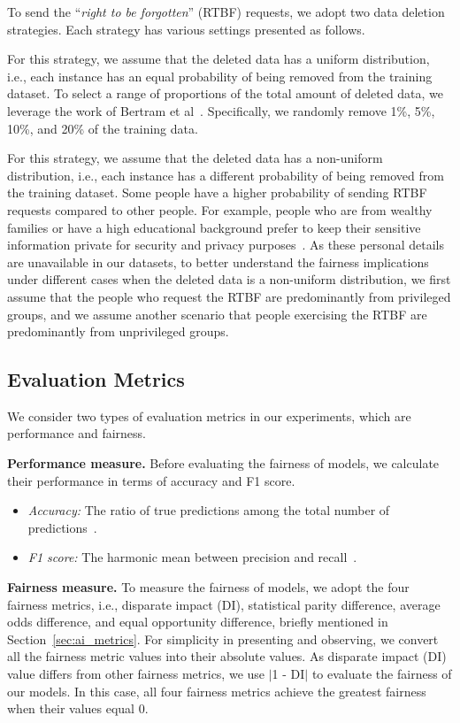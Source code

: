 To send the ``\textit{right to be forgotten}'' (RTBF) requests, we adopt two data deletion strategies. Each strategy has various settings presented as follows.


 For this strategy, we assume that the deleted data has a uniform distribution, i.e., each instance has an equal probability of being removed from the training dataset. To select a range of proportions of the total amount of deleted data, we leverage the work of Bertram et al~\cite{rtbf5years}. Specifically, we randomly remove 1\%, 5\%, 10\%, and 20\% of the training data. 

 For this strategy, we assume that the deleted data has a non-uniform distribution, i.e., each instance has a different probability of being removed from the training dataset. Some people have a higher probability of sending RTBF requests compared to other people. For example, people who are from wealthy families or have a high educational background prefer to keep their sensitive information private for security and privacy purposes~\cite{upton2001strategic, eurobarometer}. 
As these personal details are unavailable in our datasets, to better understand the fairness implications under different cases when the deleted data is a non-uniform distribution, we first assume that the people who request the RTBF are predominantly from privileged groups, and we assume another scenario that people exercising the RTBF are predominantly from unprivileged groups.




\subsection{Evaluation Metrics}
\label{sec:metrics}

We consider two types of evaluation metrics in our experiments, which are performance and fairness. 

\noindent \textbf{Performance measure.} Before evaluating the fairness of models, we calculate their performance in terms of accuracy and F1 score. 

\begin{itemize} [leftmargin=*]
    \item \textit{Accuracy:} The ratio of true predictions among the total number of predictions~\cite{gunawardana2009survey}.
    \item \textit{F1 score:} The harmonic mean between precision and recall~\cite{dalianis2018evaluation}.
\end{itemize}

\noindent \textbf{Fairness measure.} To measure the fairness of models, we adopt the four fairness metrics, i.e., disparate impact (DI), statistical parity difference, average odds difference, and equal opportunity difference, briefly mentioned in Section~\ref{sec:ai_metrics}. For simplicity in presenting and observing, we convert all the fairness metric values into their absolute values. As disparate impact (DI) value differs from other fairness metrics, we use $|$1 - DI$|$ to evaluate the fairness of our models. In this case, all four fairness metrics achieve the greatest fairness when their values equal 0.  


